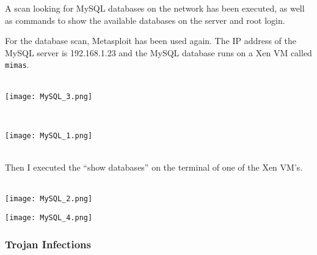 A scan looking for MySQL databases on the network has been executed, as well as commands to show the available databases on the server and root login.

For the database scan,  Metasploit has been used again. The IP address of the MySQL server is 192.168.1.23 and the MySQL database runs on a Xen VM called \texttt{mimas}. \\ \\
\noindent\begin{minipage}{\textwidth}
    \centering
    \texttt{[image: MySQL\_3.png]}
\end{minipage}
$\;$ \\ \\
\noindent\begin{minipage}{\textwidth}
    \centering
    \texttt{[image: MySQL\_1.png]}
\end{minipage}
$\;$ \\ \\
Then I executed the ``show databases'' on the terminal of one of the Xen VM's. \\ \\
\noindent\begin{minipage}{\textwidth}
    \centering
    \texttt{[image: MySQL\_2.png]}
\end{minipage}
\noindent\begin{minipage}{\textwidth}
    \centering
    \texttt{[image: MySQL\_4.png]}
\end{minipage}

\subsubsection{Trojan Infections}

